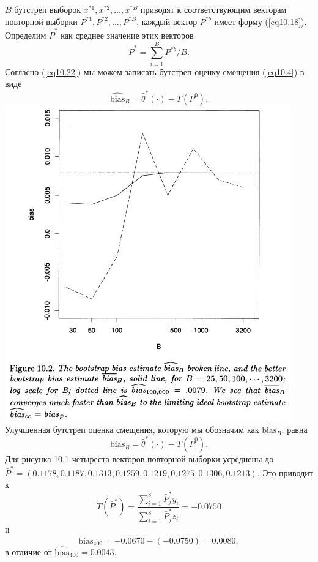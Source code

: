 $B$ бутстреп выборок $x^{*1}, x^{*2}, \dots, x^{*B}$ приводят к соответствующим векторам повторной выборки $P^{*1}, P^{*2}, \dots, P^{*B}$, каждый вектор $P^{*b}$ имеет форму (\ref{eq10.18}). Определим $\bar{P}^{*}$ как среднее значение этих векторов
\begin{equation}\label{eq10.23}
   \bar{P}^{*} = \sum\limits_{i=1}^{B}P^{*b}/B.
\end{equation}
Согласно (\ref{eq10.22}) мы можем записать бутстреп оценку смещения (\ref{eq10.4}) в виде
\begin{equation}\label{eq10.24}
   \widehat{\text{bias}}_{B} = \hat{\theta}^{*}(\cdot) - T(P^{0}).
\end{equation}
\noindent
\includegraphics[width=\linewidth]{10/f10.2.png}
\newline
Улучшенная бутстреп оценка смещения, которую мы обозначим как $\overline{\text{bias}}_{B}$, равна
\begin{equation}\label{eq10.25}
   \overline{\text{bias}}_{B} = \hat{\theta}^{*}(\cdot) - T(\bar{P}^{0}).
\end{equation}
Для рисунка 10.1 четыреста векторов повторной выборки усреднены до\\$\bar{P}^{*} =(0.1178, 0.1187, 0.1313, 0.1259, 0.1219, 0.1275, 0.1306, 0.1213)$. Это приводит к
\begin{equation}\label{eq10.26}
  T(\bar{P}^{*}) = \frac{\sum_{i=1}^{8}\bar{P}^{*}_{j}y_{i}}{\sum_{i=1}^{8}\bar{P}^{*}_{j}z_{i}} = -0.0750
\end{equation}
и
\begin{equation}\label{eq10.27}
  \overline{\text{bias}}_{400} = -0.0670 - (-0.0750) = 0.0080,
\end{equation}
в отличие от $\widehat{\text{bias}}_{400} = 0.0043$.

